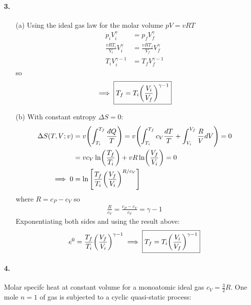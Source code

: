 \documentclass[../main.tex]{subfiles}
\begin{document}
\paragraph{3.}
\begin{enumerate}
    \item [(a)] Using the ideal gas law for the molar volume $pV = v RT$ 
    \begin{align*}
        p_i V_i^\gamma &= p_f V_f^\gamma \\
        \frac{v R T_i}{V_i} V_i^\gamma &= \frac{v R T_f}{V_f} V_f^\gamma \\
        T_i V_i^{\gamma - 1} &= T_f V_f^{\gamma - 1}
    \end{align*}
    so
    \begin{align*}
        \implies  \boxed{T_f = T_i \qt(\frac{V_i}{V_f})^{\gamma - 1}}
    \end{align*}
    \item [(b)] With constant entropy $\Delta S = 0$:
    \begin{align*}
        \Delta S(T, V; v) &= v \qt(\int_{T_i}^{T_f} \frac{\dbar Q}{T}) = v \qt(\int_{T_i}^{T_f} c_V \frac{dT}{T} + \int_{V_i}^{V_f} \frac{R}{V} dV) = 0 \\
        &= vc_V \ln(\frac{T_f}{T_i}) + vR \ln(\frac{V_f}{V_i}) = 0 \\
        \implies 0 &= \ln \qt[\frac{T_f}{T_i} \qt(\frac{V_f}{V_i})^{R/c_V}]
    \end{align*}
    where $R = c_P - c_V$ so
    \begin{align*}
        \frac{R}{c_V} = \frac{c_P - c_V}{c_V} = \gamma - 1
    \end{align*}
    Exponentiating both sides and using the result above:
    \begin{align*}
        e^0 = \frac{T_f}{T_i} \qt(\frac{V_f}{V_i})^{\gamma - 1} \implies \boxed{T_f = T_i \qt(\frac{V_i}{V_f})^{\gamma - 1}}
    \end{align*}
\end{enumerate}

\newpage
\paragraph{4.} Molar specifc heat at constant volume for a monoatomic ideal gas $c_V = \frac{3}{2} R$. One mole $n = 1$ of gas is subjected to a cyclic quasi-static process:
\end{document}
